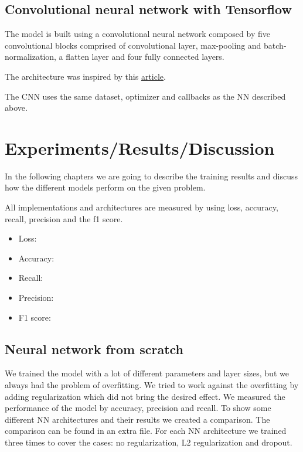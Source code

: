 \documentclass{article}
\begin{document}
\subsection{Convolutional neural network with Tensorflow}
\label{sec:convolutional_neural_network_with_tensorflow}

The model is built using a convolutional neural network composed by five convolutional blocks comprised of convolutional layer, 
max-pooling and batch-normalization, a flatten layer and four fully connected layers.

The architecture was inspired by this \href{https://towardsdatascience.com/deep-learning-for-detecting-pneumonia-from-x-ray-images-fc9a3d9fdba8}{article}.

The CNN uses the same dataset, optimizer and callbacks as the NN described above.

\section{Experiments/Results/Discussion}

In the following chapters we are going to describe the training results and discuss how the 
different models perform on the given problem.

All implementations and architectures are measured by using loss, accuracy, recall, precision and the f1 score. 
\begin{itemize}
  \item Loss: 
  \item Accuracy: 
  \item Recall: 
  \item Precision: 
  \item F1 score: 
\end{itemize}

\subsection{Neural network from scratch}
\label{sec:neural_network_from_scratch}

We trained the model with a lot of different parameters and layer sizes, 
but we always had the problem of overfitting. 
We tried to work against the overfitting by adding regularization which did not bring the desired effect. 
We measured the performance of the model by accuracy, precision and recall. 
To show some different NN architectures and their results we created a comparison. 
The comparison can be found in an extra file. 
For each NN architecture we trained three times to cover the cases: no regularization, L2 regularization and dropout.
\end{document}
